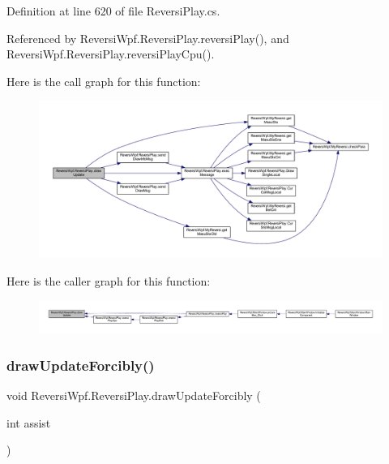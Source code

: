 Definition at line 620 of file Reversi\+Play.\+cs.



Referenced by Reversi\+Wpf.\+Reversi\+Play.\+reversi\+Play(), and Reversi\+Wpf.\+Reversi\+Play.\+reversi\+Play\+Cpu().

Here is the call graph for this function\+:\nopagebreak
\begin{figure}[H]
\begin{center}
\leavevmode
\includegraphics[width=350pt]{class_reversi_wpf_1_1_reversi_play_ae64bc4578a896ccd8fcff7b35763cf2e_cgraph}
\end{center}
\end{figure}
Here is the caller graph for this function\+:\nopagebreak
\begin{figure}[H]
\begin{center}
\leavevmode
\includegraphics[width=350pt]{class_reversi_wpf_1_1_reversi_play_ae64bc4578a896ccd8fcff7b35763cf2e_icgraph}
\end{center}
\end{figure}
\mbox{\label{class_reversi_wpf_1_1_reversi_play_a0324e804add5c651915266f0254eb26f}} 
\subsubsection{\texorpdfstring{draw\+Update\+Forcibly()}{drawUpdateForcibly()}}
{\footnotesize\ttfamily void Reversi\+Wpf.\+Reversi\+Play.\+draw\+Update\+Forcibly (\begin{DoxyParamCaption}\item[{int}]{assist }\end{DoxyParamCaption})}



